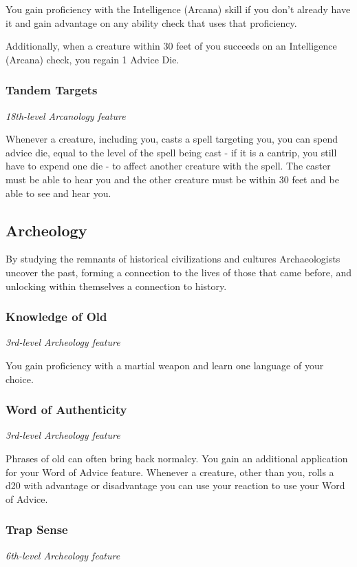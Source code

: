 \documentclass[letterpaper,openany,twoside,twocolumn]{book}
\begin{document}
	You gain proficiency with the Intelligence (Arcana) skill if you don't already have it and gain advantage on any ability check that uses that proficiency.
	
	Additionally, when a creature within 30 feet of you succeeds on an Intelligence (Arcana) check, you regain 1 Advice Die.
	
	\subsubsection*{Tandem Targets}
	\textnormal{\textit{18th-level Arcanology feature}}
	
	Whenever a creature, including you, casts a spell targeting you, you can spend advice die, equal to the level of the spell being cast - if it is a cantrip, you still have to expend one die - to affect another creature with the spell. The caster must be able to hear you and the other creature must be within 30 feet and be able to see and hear you.
	\eject
	
	\subsection*{Archeology}
	By studying the remnants of historical civilizations and cultures Archaeologists uncover the past, forming a connection to the lives of those that came before, and unlocking within themselves a connection to history.
	
	\subsubsection*{Knowledge of Old}
	\textnormal{\textit{3rd-level Archeology feature}}
	
	You gain proficiency with a martial weapon and learn one language of your choice.
	
	\subsubsection*{Word of Authenticity}
	\textnormal{\textit{3rd-level Archeology feature}}
	
	Phrases of old can often bring back normalcy. You gain an additional application for your Word of Advice feature. Whenever a creature, other than you, rolls a d20 with advantage or disadvantage you can use your reaction to use your Word of Advice.
	
	\subsubsection*{Trap Sense}
	\textnormal{\textit{6th-level Archeology feature}}
	
\end{document}
